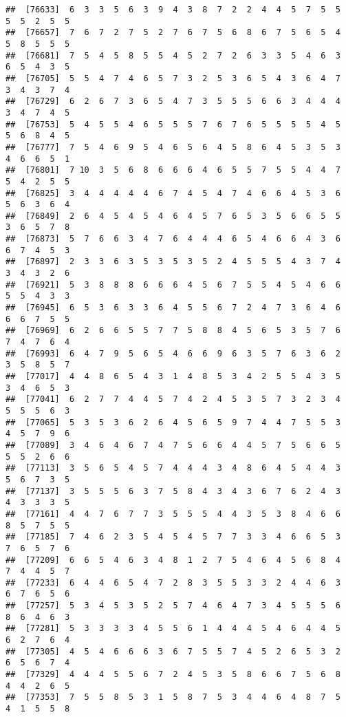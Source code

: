 \documentclass[
]{book}
\begin{document}
\begin{verbatim}
##  [76633]  6  3  3  5  6  3  9  4  3  8  7  2  2  4  4  5  7  5  5  5  5  2  5  5
##  [76657]  7  6  7  2  7  5  2  7  6  7  5  6  8  6  7  5  6  5  4  5  8  5  5  5
##  [76681]  7  5  4  5  8  5  5  4  5  2  7  2  6  3  3  5  4  6  3  6  5  4  3  5
##  [76705]  5  5  4  7  4  6  5  7  3  2  5  3  6  5  4  3  6  4  7  3  4  3  7  4
##  [76729]  6  2  6  7  3  6  5  4  7  3  5  5  5  6  6  3  4  4  4  3  4  7  4  5
##  [76753]  5  4  5  5  4  6  5  5  5  7  6  7  6  5  5  5  5  4  5  5  6  8  4  5
##  [76777]  7  5  4  6  9  5  4  6  5  6  4  5  8  6  4  5  3  5  3  4  6  6  5  1
##  [76801]  7 10  3  5  6  8  6  6  6  4  6  5  5  7  5  5  4  4  7  5  4  2  5  5
##  [76825]  3  4  4  4  4  4  6  7  4  5  4  7  4  6  6  4  5  3  6  5  6  3  6  4
##  [76849]  2  6  4  5  4  5  4  6  4  5  7  6  5  3  5  6  6  5  5  3  6  5  7  8
##  [76873]  5  7  6  6  3  4  7  6  4  4  4  6  5  4  6  6  4  3  6  6  7  4  5  3
##  [76897]  2  3  3  6  3  5  3  5  3  5  2  4  5  5  5  4  3  7  4  3  4  3  2  6
##  [76921]  5  3  8  8  8  6  6  6  4  5  6  7  5  5  4  5  4  6  6  5  5  4  3  3
##  [76945]  6  5  3  6  3  3  6  4  5  5  6  7  2  4  7  3  6  4  6  6  6  7  5  5
##  [76969]  6  2  6  6  5  5  7  7  5  8  8  4  5  6  5  3  5  7  6  7  4  7  6  4
##  [76993]  6  4  7  9  5  6  5  4  6  6  9  6  3  5  7  6  3  6  2  3  5  8  5  7
##  [77017]  4  4  8  6  5  4  3  1  4  8  5  3  4  2  5  5  4  3  5  3  4  6  5  3
##  [77041]  6  2  7  7  4  4  5  7  4  2  4  5  3  5  7  3  2  3  4  5  5  5  6  3
##  [77065]  5  3  5  3  6  2  6  4  5  6  5  9  7  4  4  7  5  5  3  4  5  7  9  6
##  [77089]  3  4  6  4  6  7  4  7  5  6  6  4  4  5  7  5  6  6  5  5  5  2  6  6
##  [77113]  3  5  6  5  4  5  7  4  4  4  3  4  8  6  4  5  4  4  3  5  6  7  3  5
##  [77137]  3  5  5  5  6  3  7  5  8  4  3  4  3  6  7  6  2  4  3  4  3  3  3  5
##  [77161]  4  4  7  6  7  7  3  5  5  5  4  4  3  5  3  8  4  6  6  8  5  7  5  5
##  [77185]  7  4  6  2  3  5  4  5  4  5  7  7  3  3  4  6  6  5  3  7  6  5  7  6
##  [77209]  6  6  5  4  6  3  4  8  1  2  7  5  4  6  4  5  6  8  4  7  4  4  5  7
##  [77233]  6  4  4  6  5  4  7  2  8  3  5  5  3  3  2  4  4  6  3  6  7  6  5  6
##  [77257]  5  3  4  5  3  5  2  5  7  4  6  4  7  3  4  5  5  5  6  8  6  4  6  3
##  [77281]  5  3  3  3  3  4  5  5  6  1  4  4  4  5  4  6  4  4  5  6  2  7  6  4
##  [77305]  4  5  4  6  6  6  3  6  7  5  5  7  4  5  2  6  5  3  2  6  5  6  7  4
##  [77329]  4  4  4  5  5  6  7  2  4  5  3  5  8  6  6  7  5  6  8  4  4  2  6  5
##  [77353]  7  5  5  8  5  3  1  5  8  7  5  3  4  4  6  4  8  7  5  4  1  5  5  8

\end{verbatim}
\end{document}
